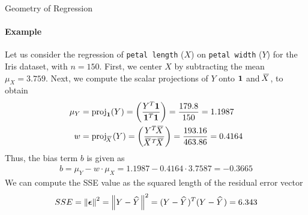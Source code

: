 \begin{frame}{Geometry of Regression}
\framesubtitle{Example}
    Let us consider the regression of \texttt{petal length} ($X$) on 
    \texttt{petal width} ($Y$) for the Iris dataset, with $n=150$. 
    First,
    we center $X$ by subtracting the mean $\mu_X = 3.759$.
    Next, we compute the scalar projections of $Y$ onto $\mathbf{1}$ and $\mkern 1.5mu\overline{\mkern-4.0muX}\mkern 1.5mu$, 
    to obtain
    \begin{align*}
        \mu_Y & = \operatorname{proj}_{\mathbf{1}}(Y) = \left(\frac{Y^T \mathbf{1}}{\mathbf{1}^T\mathbf{1}} \right)
        = \frac{179.8}{150} = 1.1987\\
        w & = \operatorname{proj}_{\mkern 1.5mu\overline{\mkern-4.0muX}\mkern 1.5mu}(Y) = \left(\frac{Y^T \mkern 1.5mu\overline{\mkern-4.0muX}\mkern 1.5mu}{\mkern 1.5mu\overline{\mkern-4.0muX}\mkern 1.5mu^T \mkern 1.5mu\overline{\mkern-4.0muX}\mkern 1.5mu} \right) =
        \frac{193.16}{463.86} = 0.4164
    \end{align*}
    Thus, the bias term $b$ is given as
    \begin{align*}
        b = \mu_Y - w \cdot \mu_X = 1.1987 - 0.4164 \cdot 3.7587 =
        -0.3665
    \end{align*}
    We can compute the SSE value %
    as the squared length of the residual error vector
    \begin{align*}
        SSE = \left\lVert{\bm \epsilon}\right\rVert^2 = \left\lVert Y - \mkern 1.5mu\widehat{\mkern-1.5muY}\mkern 1.5mu\right\rVert^2 = (Y - \mkern 1.5mu\widehat{\mkern-1.5muY}\mkern 1.5mu)^T(Y-\mkern 1.5mu\widehat{\mkern-1.5muY}\mkern 1.5mu)
        = 6.343
    \end{align*}
\end{frame}
%
%

\ifdefined\wox \begin{frame} \titlepage \end{frame} \fi

